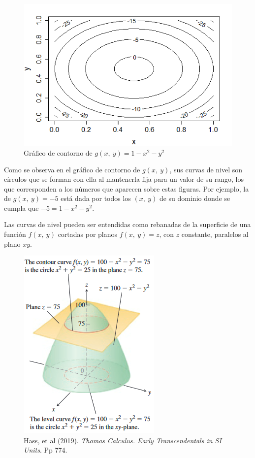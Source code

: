 \documentclass[12pt]{article}
\begin{document}
\begin{figure}[hbt!]
\centering
\includegraphics[scale = 0.45]{contorno-01.png}
\caption{Gráfico de contorno de $g(x, \ y) = 1 - x^{2} - y^{2}$}
\end{figure}

Como se observa en el gráfico de contorno de $g(x, \ y)$, sus curvas de nivel son círculos que se forman con ella al mantenerla fija para un valor de su rango, los que corresponden a los números que aparecen sobre estas figuras. Por ejemplo, la de $g(x, \ y) = -5$ está dada por todos los $(x, \ y)$ de su dominio donde se cumpla que $-5 = 1 - x^{2} - y^{2}$.

Las curvas de nivel pueden ser entendidas como rebanadas de la superficie de una función $f(x, \ y)$ cortadas por planos $f(x, \ y) = z$, con $z$ constante, paralelos al plano $xy$.

\begin{figure}[hbt!]
\centering
\includegraphics[scale = 0.55]{contorno-02.png}
\caption{Hass, et al (2019). \textit{Thomas Calculus. Early Transcendentals in SI Units}. Pp 774.}
\end{figure}
\end{document}
